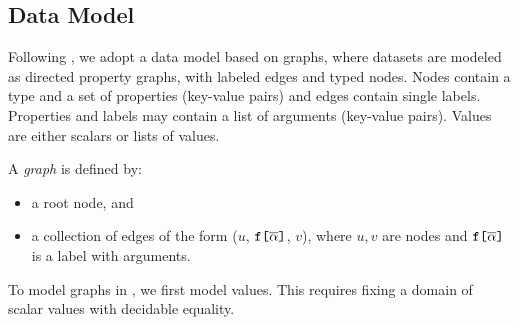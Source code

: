 



\subsection{Data Model}\label{subsec:graph}
Following \HP, we adopt a data model based on graphs, where datasets are
modeled as directed property graphs, with labeled edges and typed
nodes. Nodes contain a type and a set of properties (key-value pairs)
and edges contain single labels. Properties and labels may contain a list of
arguments (key-value pairs). Values are either scalars or
lists of values.  %
%
%
\begin{definition}
A \emph{\gql graph} is defined by:
\begin{itemize}
    \item a root node, and
    \item a collection of edges of the form ($u$, $\texttt{f[}\overline{\alpha}\texttt{]}$, $v$), where $u, v$ are nodes and
      $\texttt{f[}\overline{\alpha}\texttt{]}$ is a label with arguments.
\end{itemize}
\end{definition}
%
\noindent To model graphs in \coq, we first model values. This requires fixing a
domain of scalar values with decidable equality.


